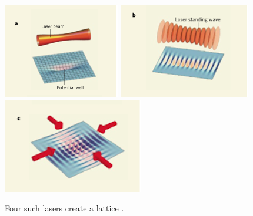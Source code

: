 \documentclass[aspectratio=169]{beamer}
\begin{document}
\begin{frame}
\begin{onlyenv}
\begin{figure}
        \includegraphics[scale=0.5]{../img/Optical-lattice-creation-a.png} \includegraphics[scale=0.5]{../img/Optical-lattice-creation-b.png}\includegraphics[scale=0.5]{../img/Optical-lattice-creation-c.png}
        \caption{Four such lasers create a lattice \footnotemark[1].}
      \end{figure} 
    \end{onlyenv}
\end{frame}
\end{document}
